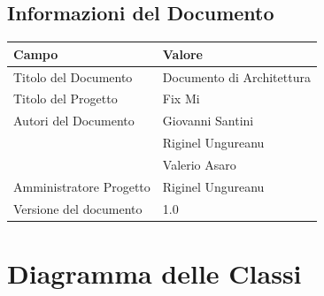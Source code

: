 \documentclass{report}
\begin{document}
	
	
	
	\section{Informazioni del Documento}
	
	\begin{center} %
		\centering
		\begin{tabular}{ |p{4cm}|p{4cm}|  }
			\hline
			\centering Campo & \qquad\qquad Valore \\ %
			\hline
			Titolo del Documento & Documento di Architettura \\
			\hline
			Titolo del Progetto & Fix Mi \\
			\hline
			Autori del Documento &
			Giovanni Santini \\ & Riginel Ungureanu \\ & Valerio Asaro \\
			\hline
			Amministratore Progetto & Riginel Ungureanu\\
			\hline
			Versione del documento & 1.0 \\
			\hline
		\end{tabular}
	\end{center}
	

	
\chapter{Diagramma delle Classi}
\end{document}
